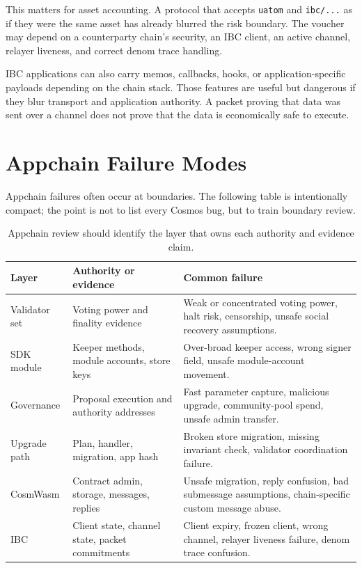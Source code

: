 This matters for asset accounting. A protocol that accepts \texttt{uatom} and \texttt{ibc/...} as if they were the same asset has already blurred the risk boundary. The voucher may depend on a counterparty chain's security, an IBC client, an active channel, relayer liveness, and correct denom trace handling.

IBC applications can also carry memos, callbacks, hooks, or application-specific payloads depending on the chain stack. Those features are useful but dangerous if they blur transport and application authority. A packet proving that data was sent over a channel does not prove that the data is economically safe to execute.

\section{Appchain Failure Modes}

Appchain failures often occur at boundaries. The following table is intentionally compact; the point is not to list every Cosmos bug, but to train boundary review.

\begin{table}[htbp]
\centering
\small
\renewcommand{\arraystretch}{1.18}
\begin{tabularx}{\textwidth}{@{}>{\RaggedRight\arraybackslash}p{}>{\RaggedRight\arraybackslash}p{}>{\RaggedRight\arraybackslash}X@{}}
\toprule
Layer & Authority or evidence & Common failure \\
\midrule
Validator set & Voting power and finality evidence & Weak or concentrated voting power, halt risk, censorship, unsafe social recovery assumptions. \\
SDK module & Keeper methods, module accounts, store keys & Over-broad keeper access, wrong signer field, unsafe module-account movement. \\
Governance & Proposal execution and authority addresses & Fast parameter capture, malicious upgrade, community-pool spend, unsafe admin transfer. \\
Upgrade path & Plan, handler, migration, app hash & Broken store migration, missing invariant check, validator coordination failure. \\
CosmWasm & Contract admin, storage, messages, replies & Unsafe migration, reply confusion, bad submessage assumptions, chain-specific custom message abuse. \\
IBC & Client state, channel state, packet commitments & Client expiry, frozen client, wrong channel, relayer liveness failure, denom trace confusion. \\
\bottomrule
\end{tabularx}
\caption{Appchain review should identify the layer that owns each authority and evidence claim.}
\end{table}

